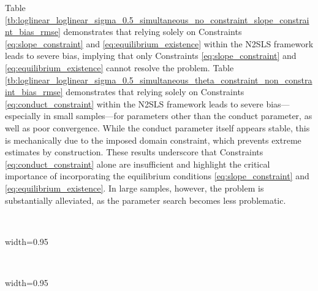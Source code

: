 \documentclass[11pt, a4paper]{article}
\theoremstyle{remark}
\begin{document}
Table \ref{tb:loglinear_loglinear_sigma_0.5_simultaneous_no_constraint_slope_constraint_bias_rmse} demonstrates that relying solely on Constraints \eqref{eq:slope_constraint} and \eqref{eq:equilibrium_existence} within the N2SLS framework leads to severe bias, implying that only Constraints \eqref{eq:slope_constraint} and \eqref{eq:equilibrium_existence} cannot resolve the problem. Table \ref{tb:loglinear_loglinear_sigma_0.5_simultaneous_theta_constraint_non_constraint_bias_rmse} demonstrates that relying solely on Constraints \eqref{eq:conduct_constraint} within the N2SLS framework leads to severe bias—especially in small samples—for parameters other than the conduct parameter, as well as poor convergence. While the conduct parameter itself appears stable, this is mechanically due to the imposed domain constraint, which prevents extreme estimates by construction. These results underscore that Constraints \eqref{eq:conduct_constraint} alone are insufficient and highlight the critical importance of incorporating the equilibrium conditions \eqref{eq:slope_constraint} and \eqref{eq:equilibrium_existence}. In large samples, however, the problem is substantially alleviated, as the parameter search becomes less problematic. 






\begin{table}[!htbp]
  \centering
  \caption{Performance comparison ($\sigma=0.5$)}
  \label{tb:loglinear_loglinear_sigma_0.5_simultaneous_theta_constraint_slope_constraint_bias_rmse}
  \\[0.5em]
  \begin{adjustbox}{width=0.95\textwidth}
    
  \end{adjustbox}
  \vspace{1.5em}  %
  \\[0.5em]
  \begin{adjustbox}{width=0.95\textwidth}
   
  \end{adjustbox}
  \footnotesize
\end{table}
\end{document}
